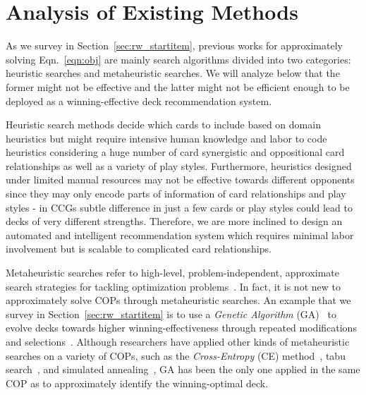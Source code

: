
\section{Analysis of Existing Methods}\label{sec:qdeckrec_existmethodanaly}
As we survey in Section~\ref{sec:rw_startitem}, previous works for approximately solving Eqn.~\ref{eqn:obj} are mainly search algorithms divided into two categories: heuristic searches and metaheuristic searches. We will analyze below that the former might not be effective and the latter might not be efficient enough to be deployed as a winning-effective deck recommendation system.

Heuristic search methods decide which cards to include based on domain heuristics but might require intensive human knowledge and labor to code heuristics considering a huge number of card synergistic and oppositional card relationships as well as a variety of play styles. Furthermore, heuristics designed under limited manual resources may not be effective towards different opponents since they may only encode parts of information of card relationships and play styles - in CCGs subtle difference in just a few cards or play styles could lead to decks of very different strengths. Therefore, we are more inclined to design an automated and intelligent recommendation system which requires minimal labor involvement but is scalable to complicated card relationships. 

Metaheuristic searches refer to high-level, problem-independent, approximate search strategies for tackling optimization problems~\cite{birattari2009tuning}. In fact, it is not new to approximately solve COPs through metaheuristic searches.  An example that we survey in Section~\ref{sec:rw_startitem} is to use a \textit{Genetic Algorithm} (GA)~\cite{holland1992adaptation} to evolve decks towards higher winning-effectiveness through repeated modifications and selections~\cite{garcia2016evolutionary,bjorke2017deckbuilding}. Although researchers have applied other kinds of metaheuristic searches on a variety of COPs, such as the \textit{Cross-Entropy} (CE) method~\cite{rubinstein1999cross}, tabu search~\cite{glover1986future}, and simulated annealing~\cite{kirkpatrick1983optimization}, GA has been the only one applied in the same COP as to approximately identify the winning-optimal deck. 

